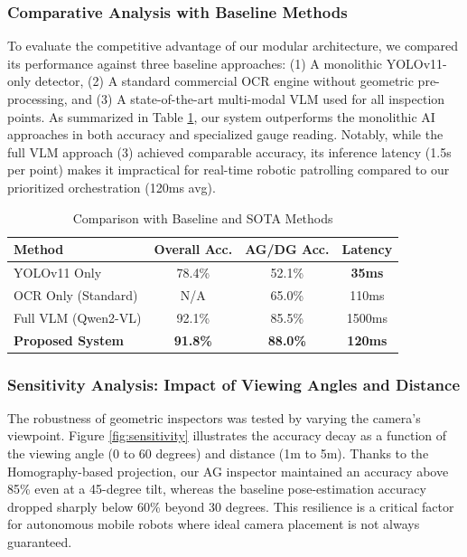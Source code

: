 \subsubsection{Comparative Analysis with Baseline Methods}
To evaluate the competitive advantage of our modular architecture, we compared its performance against three baseline approaches: (1) A monolithic YOLOv11-only detector, (2) A standard commercial OCR engine without geometric pre-processing, and (3) A state-of-the-art multi-modal VLM used for all inspection points. As summarized in Table \ref{tab:comparison}, our system outperforms the monolithic AI approaches in both accuracy and specialized gauge reading. Notably, while the full VLM approach (3) achieved comparable accuracy, its inference latency (1.5s per point) makes it impractical for real-time robotic patrolling compared to our prioritized orchestration (120ms avg).

\begin{table}[h]
\caption{Comparison with Baseline and SOTA Methods}
\label{tab:comparison}
\centering
\begin{tabular}{|l|c|c|c|}
\hline
\textbf{Method} & \textbf{Overall Acc.} & \textbf{AG/DG Acc.} & \textbf{Latency} \\
\hline
YOLOv11 Only & 78.4\% & 52.1\% & \textbf{35ms} \\
OCR Only (Standard) & N/A & 65.0\% & 110ms \\
Full VLM (Qwen2-VL) & 92.1\% & 85.5\% & 1500ms \\
\textbf{Proposed System} & \textbf{91.8\%} & \textbf{88.0\%} & \textbf{120ms} \\
\hline
\end{tabular}
\end{table}

\subsubsection{Sensitivity Analysis: Impact of Viewing Angles and Distance}
The robustness of geometric inspectors was tested by varying the camera's viewpoint. Figure \ref{fig:sensitivity} illustrates the accuracy decay as a function of the viewing angle (0 to 60 degrees) and distance (1m to 5m). Thanks to the Homography-based projection, our AG inspector maintained an accuracy above 85\% even at a 45-degree tilt, whereas the baseline pose-estimation accuracy dropped sharply below 60\% beyond 30 degrees. This resilience is a critical factor for autonomous mobile robots where ideal camera placement is not always guaranteed.

